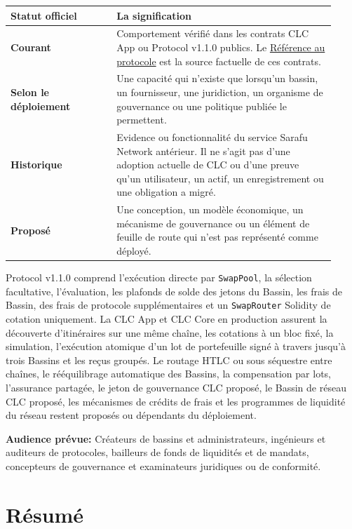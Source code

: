 \documentclass[11pt]{article}
\begin{document}
\begin{longtable}{P{0.30\linewidth} P{0.62\linewidth}}
\toprule
Statut officiel & La signification \\
\midrule
\endhead
\textbf{Courant} & Comportement vérifié dans les contrats CLC App ou Protocol v1.1.0 publics. Le \href{https://docs.cosmolocal.credit/fr/protocol/overview}{Référence au protocole} est la source factuelle de ces contrats. \\
\textbf{Selon le déploiement} & Une capacité qui n'existe que lorsqu'un bassin, un fournisseur, une juridiction, un organisme de gouvernance ou une politique publiée le permettent. \\
\textbf{Historique} & Evidence ou fonctionnalité du service Sarafu Network antérieur. Il ne s'agit pas d'une adoption actuelle de CLC ou d'une preuve qu'un utilisateur, un actif, un enregistrement ou une obligation a migré. \\
\textbf{Proposé} & Une conception, un modèle économique, un mécanisme de gouvernance ou un élément de feuille de route qui n'est pas représenté comme déployé. \\
\bottomrule
\end{longtable}

Protocol v1.1.0 comprend l'exécution directe par \texttt{SwapPool}, la sélection facultative, l'évaluation, les plafonds de solde des jetons du Bassin, les frais de Bassin, des frais de protocole supplémentaires et un \texttt{SwapRouter} Solidity de cotation uniquement. La CLC App et CLC Core en production assurent la découverte d'itinéraires sur une même chaîne, les cotations à un bloc fixé, la simulation, l'exécution atomique d'un lot de portefeuille signé à travers jusqu'à trois Bassins et les reçus groupés. Le routage HTLC ou sous séquestre entre chaînes, le rééquilibrage automatique des Bassins, la compensation par lots, l'assurance partagée, le jeton de gouvernance CLC proposé, le Bassin de réseau CLC proposé, les mécanismes de crédits de frais et les programmes de liquidité du réseau restent proposés ou dépendants du déploiement.

\textbf{Audience prévue:} Créateurs de bassins et administrateurs, ingénieurs et auditeurs de protocoles, bailleurs de fonds de liquidités et de mandats, concepteurs de gouvernance et examinateurs juridiques ou de conformité.

\section*{Résumé}
\end{document}
